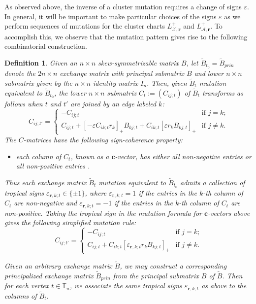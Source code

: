 \documentclass{amsart}
\newtheorem{definition}[theorem]{Definition}
\numberwithin{equation}{section}
\newcommand{\bfc}{\mathbf{c}}
\newcommand{\bfr}{{\boldsymbol{r}}}
\newcommand{\cA}{\mathcal{A}}
\newcommand{\cX}{\mathcal{X}}
\newcommand{\TT}{\mathbb{T}}
\begin{document}
As observed above, the inverse of a cluster mutation requires a change of signs $\varepsilon$.
In general, it will be important to make particular choices of the signs $\varepsilon$ as we perform sequences of mutations for the cluster charts $L^+_{\cX,\bfr}$ and $L^+_{\cA,\bfr}$.
To accomplish this, we observe that the mutation pattern gives rise to the following combinatorial construction.
\begin{definition}
  \label{def:tropical signs}
  Given an $n\times n$ skew-symmetrizable matrix $B$, let $\tilde B_{t_0}=\tilde B_{prin}$ denote the $2n\times n$ exchange matrix with principal submatrix $B$ and lower $n\times n$ submatrix given by the $n\times n$ identity matrix $I_n$.
  Then, given $\tilde B_t$ mutation equivalent to $\tilde B_{t_0}$, the lower $n\times n$ submatrix $C_t:=(C_{ij;t})$ of $\tilde B_t$ transforms as follows when $t$ and $t'$ are joined by an edge labeled $k$:
  \begin{equation}
    \label{eq:c-matrix mutation1}
    C_{ij;t'}=
    \begin{cases}
      -C_{ij;t} & \text{if $j=k$;}\\
      C_{ij;t}+[-\varepsilon C_{ik;t} r_k]_+B_{kj;t}+C_{ik;t}[\varepsilon r_kB_{kj;t}]_+ & \text{if $j\ne k$.}
    \end{cases}
  \end{equation}
  The $C$-matrices have the following \emph{sign-coherence} property: 
  \begin{itemize}
    \item each column of $C_t$, known as a \emph{$\bfc$-vector}, has either all non-negative entries or all non-positive entries \cite{FZ07,NZ12,GHKK14,NR16}.
  \end{itemize}
  Thus each exchange matrix $\tilde B_t$ mutation equivalent to $\tilde B_{t_0}$ admits a collection of \emph{tropical signs} $\varepsilon_{\bfr,k;t}\in\{\pm1\}$, where $\varepsilon_{\bfr,k;t}=1$ if the entries in the $k$-th column of $C_t$ are non-negative and $\varepsilon_{\bfr,k;t}=-1$ if the entries in the $k$-th column of $C_t$ are non-positive. 
  Taking the tropical sign in the mutation formula for $\bfc$-vectors above gives the following simplified mutation rule:
  \begin{equation}
    \label{eq:c-matrix mutation2}
    C_{ij;t'}=
    \begin{cases}
      -C_{ij;t} & \text{if $j=k$;}\\
      C_{ij;t}+C_{ik;t}[\varepsilon_{\bfr,k;t} r_kB_{kj;t}]_+ & \text{if $j\ne k$.}
    \end{cases}
  \end{equation}

  Given an arbitrary exchange matrix $\tilde B$, we may construct a corresponding principalized exchange matrix $\tilde B_{prin}$ from the principal submatrix $B$ of $\tilde B$.
  Then for each vertex $t\in\TT_n$, we associate the same tropical signs $\varepsilon_{\bfr,k;t}$ as above to the columns of $\tilde B_t$.
\end{definition}
\end{document}
